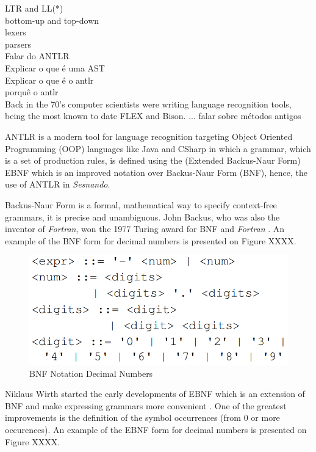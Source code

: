 LTR and LL(*)\\
bottom-up and top-down\\
lexers\\
parsers\\
Falar do ANTLR\\
Explicar o que é uma AST\\
Explicar o que é o antlr\\
porquê o antlr\\


Back in the 70's computer scientists were writing language recognition tools, being the most known to date FLEX and Bison. ...
falar sobre métodos antigos

ANTLR is a modern tool for language recognition targeting Object Oriented Programming (OOP) languages like Java and CSharp in which a grammar, which is a set of production rules, is defined using the (Extended Backus-Naur Form) EBNF which is an improved notation over Backus-Naur Form (BNF), hence, the use of ANTLR in \textit{Sesnando}.

Backus-Naur Form is a formal, mathematical way to specify context-free grammars, it is precise and unambiguous. John Backus, who was also the inventor of \textit{Fortran}, won the 1977 Turing award for BNF and \textit{Fortran} \cite{bnf_vs_ebnf} . An example of the BNF form for decimal numbers is presented on Figure XXXX.

\begin{figure}[H]
    \centering
    \includegraphics[scale=0.5]{images/BNF.PNG}
    \caption{BNF Notation Decimal Numbers}
    \label{fig:bnf}
\end{figure}

Niklaus Wirth started the early developments of EBNF which is an extension of BNF and make expressing grammars more convenient \cite{bnf_vs_ebnf}. One of the greatest improvements is the definition of the symbol occurrences (from 0 or more occurences). An example of the EBNF form for decimal numbers is presented on Figure XXXX.

